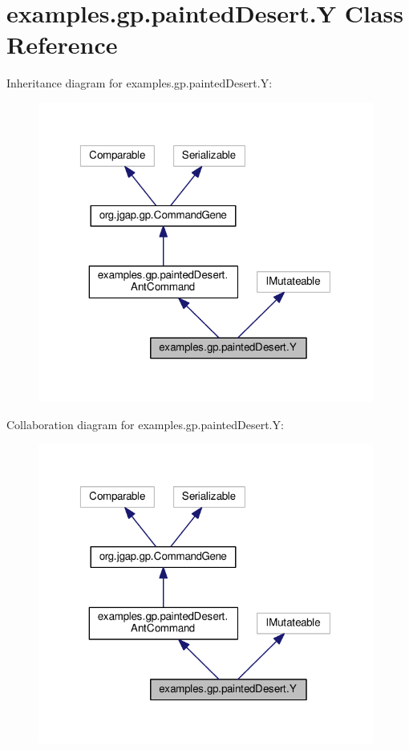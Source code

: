 \hypertarget{classexamples_1_1gp_1_1painted_desert_1_1_y}{\section{examples.\-gp.\-painted\-Desert.\-Y Class Reference}
\label{classexamples_1_1gp_1_1painted_desert_1_1_y}
}


Inheritance diagram for examples.\-gp.\-painted\-Desert.\-Y\-:
\nopagebreak
\begin{figure}[H]
\begin{center}
\leavevmode
\includegraphics[width=313pt]{classexamples_1_1gp_1_1painted_desert_1_1_y__inherit__graph}
\end{center}
\end{figure}


Collaboration diagram for examples.\-gp.\-painted\-Desert.\-Y\-:
\nopagebreak
\begin{figure}[H]
\begin{center}
\leavevmode
\includegraphics[width=313pt]{classexamples_1_1gp_1_1painted_desert_1_1_y__coll__graph}
\end{center}
\end{figure}
